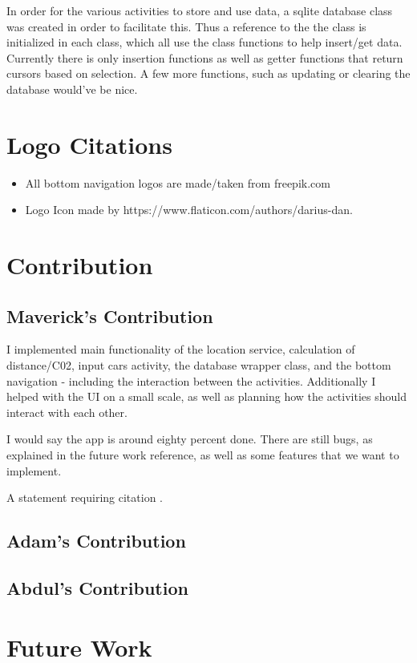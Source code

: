 \documentclass[twoside,twocolumn]{article}
\begin{document}
In order for the various activities to store and use data, a sqlite database class was created in order to facilitate this. Thus a reference to  the the class is initialized in each class, which all use the class functions to help insert/get data. Currently there is only insertion functions as well as getter functions that return cursors based on selection. A few more functions, such as updating or clearing the database would've be nice. 


\section{Logo Citations}
\begin{itemize}
\item All bottom navigation logos are made/taken from freepik.com
\item Logo Icon made by https://www.flaticon.com/authors/darius-dan.
\end{itemize}

\section{Contribution}

\subsection{Maverick's Contribution}
I implemented main functionality of the location service, calculation of distance/C02, input cars activity, the database wrapper class, and the bottom navigation - including the interaction between the activities. Additionally I helped with the UI on a small scale, as well as planning how the activities should interact with each other.

I would say the app is around eighty percent done. There are still bugs, as explained in the future work reference, as well as some features that we want to implement. 

A statement requiring citation \cite{Figueredo:2009dg}.

\subsection{Adam's Contribution}


\subsection{Abdul's Contribution}

\section{Future Work}
\end{document}
